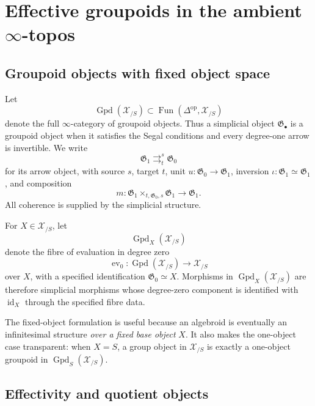\section{Effective groupoids in the ambient $\infty$-topos}
\label{sec:flg-effective-groupoids}

\subsection{Groupoid objects with fixed object space}

Let
\[
    \operatorname{Gpd}(\mathcal X_{/S})
    \subset
    \operatorname{Fun}(\Delta^{\mathrm{op}},\mathcal X_{/S})
\]
denote the full $\infty$-category of groupoid objects.  Thus a simplicial object
$\mathfrak G_\bullet$ is a groupoid object when it satisfies the Segal
conditions and every degree-one arrow is invertible.  We write
\[
    \mathfrak G_1
    \mathop{\rightrightarrows}^{s}_{t}
    \mathfrak G_0
\]
for its arrow object, with source $s$, target $t$, unit
$u:\mathfrak G_0\to\mathfrak G_1$, inversion
$\iota:\mathfrak G_1\simeq\mathfrak G_1$, and composition
\[
    m:
    \mathfrak G_1\times_{t,\mathfrak G_0,s}\mathfrak G_1
    \longrightarrow
    \mathfrak G_1.
\]
All coherence is supplied by the simplicial structure.

\begin{definition}
\label{def:fixed-object-groupoids}
For $X\in\mathcal X_{/S}$, let
\[
    \operatorname{Gpd}_X(\mathcal X_{/S})
\]
denote the fibre of evaluation in degree zero
\[
    \operatorname{ev}_0:
    \operatorname{Gpd}(\mathcal X_{/S})
    \longrightarrow
    \mathcal X_{/S}
\]
over $X$, with a specified identification $\mathfrak G_0\simeq X$.
Morphisms in $\operatorname{Gpd}_X(\mathcal X_{/S})$ are therefore
simplicial morphisms whose degree-zero component is identified with
$\operatorname{id}_X$ through the specified fibre data.
\end{definition}

\begin{remark}
The fixed-object formulation is useful because an algebroid is eventually an
infinitesimal structure \emph{over a fixed base object} $X$.  It also makes the
one-object case transparent: when $X=S$, a group object in
$\mathcal X_{/S}$ is exactly a one-object groupoid in
$\operatorname{Gpd}_S(\mathcal X_{/S})$.
\end{remark}

\subsection{Effectivity and quotient objects}

